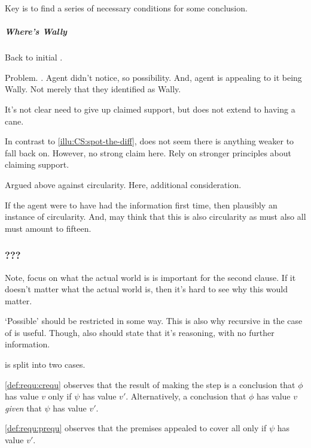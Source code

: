\begin{note}
  Key is to find a series of necessary conditions for some conclusion.
\end{note}

\subparagraph{Where's Wally}

\begin{note}
  Back to initial .
\end{note}

\begin{note}
  Problem.
  \requ{}.
  Agent didn't notice, so possibility.
  And, agent is appealing to it being Wally.
  Not merely that they identified as Wally.

  It's not clear need to give up claimed support, but does not extend to having a cane.

  In contrast to \ref{illu:CS:spot-the-diff}, does not seem there is anything weaker to fall back on.
  However, no strong claim here.
  Rely on stronger principles about claiming support.
\end{note}

\begin{note}
  Argued above against circularity.
  Here, additional consideration.

  If the agent were to have had the information first time, then plausibly an instance of circularity.
  And, may think that this is also circularity as must also all must amount to fifteen.
\end{note}

\hozline

\subsubsection{???}

\begin{note}
    \color{red}
    Note, focus on what the actual world is is important for the second clause.
    If it doesn't matter what the actual world is, then it's hard to see why this would matter.

    `Possible' should be restricted in some way.
    This is also why recursive in the case of \support{} is useful.
    Though, also should state that it's reasoning, with no further information.

    \requ{} is split into two cases.

    \ref{def:requ:crequ} observes that the result of making the step is a conclusion that \(\phi\) has value \(v\) only if \(\psi\) has value \(v'\).
    Alternatively, a conclusion that \(\phi\) has value \(v\) \emph{given} that \(\psi\) has value \(v'\).

    \ref{def:requ:prequ} observes that the premises appealed to cover all  only if \(\psi\) has value \(v'\).
\end{note}

